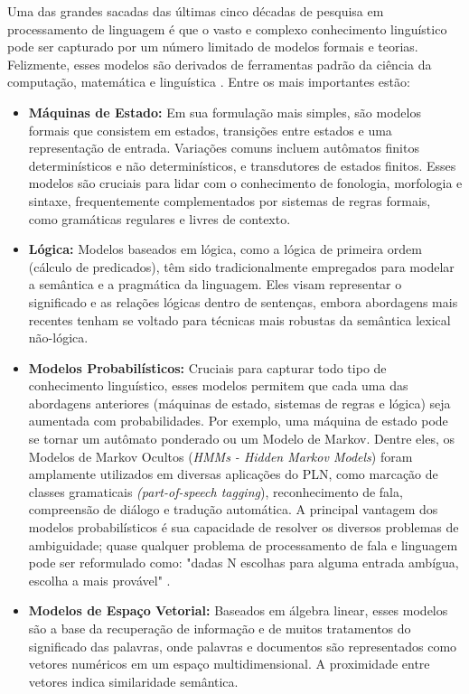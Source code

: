 Uma das grandes sacadas das últimas cinco décadas de pesquisa em processamento de linguagem é que o vasto e complexo conhecimento linguístico pode ser capturado por um número limitado de modelos formais e teorias. Felizmente, esses modelos são derivados de ferramentas padrão da ciência da computação, matemática e linguística \cite{jurafsky_speech_2009}. Entre os mais importantes estão:

\begin{itemize}
    \item \textbf{Máquinas de Estado:} Em sua formulação mais simples, são modelos formais que consistem em estados, transições entre estados e uma representação de entrada. Variações comuns incluem autômatos finitos determinísticos e não determinísticos, e transdutores de estados finitos. Esses modelos são cruciais para lidar com o conhecimento de fonologia, morfologia e sintaxe, frequentemente complementados por sistemas de regras formais, como gramáticas regulares e livres de contexto.
    \item \textbf{Lógica:} Modelos baseados em lógica, como a lógica de primeira ordem (cálculo de predicados), têm sido tradicionalmente empregados para modelar a semântica e a pragmática da linguagem. Eles visam representar o significado e as relações lógicas dentro de sentenças, embora abordagens mais recentes tenham se voltado para técnicas mais robustas da semântica lexical não-lógica.
    \item \textbf{Modelos Probabilísticos:} Cruciais para capturar todo tipo de conhecimento linguístico, esses modelos permitem que cada uma das abordagens anteriores (máquinas de estado, sistemas de regras e lógica) seja aumentada com probabilidades. Por exemplo, uma máquina de estado pode se tornar um autômato ponderado ou um Modelo de Markov. Dentre eles, os Modelos de Markov Ocultos (\textit{HMMs - Hidden Markov Models}) foram amplamente utilizados em diversas aplicações do PLN, como marcação de classes gramaticais \textit{(part-of-speech tagging}), reconhecimento de fala, compreensão de diálogo e tradução automática. A principal vantagem dos modelos probabilísticos é sua capacidade de resolver os diversos problemas de ambiguidade; quase qualquer problema de processamento de fala e linguagem pode ser reformulado como: "dadas N escolhas para alguma entrada ambígua, escolha a mais provável" \cite{jurafsky_speech_2009}.

    \item \textbf{Modelos de Espaço Vetorial:} Baseados em álgebra linear, esses modelos são a base da recuperação de informação e de muitos tratamentos do significado das palavras, onde palavras e documentos são representados como vetores numéricos em um espaço multidimensional. A proximidade entre vetores indica similaridade semântica.
\end{itemize}

